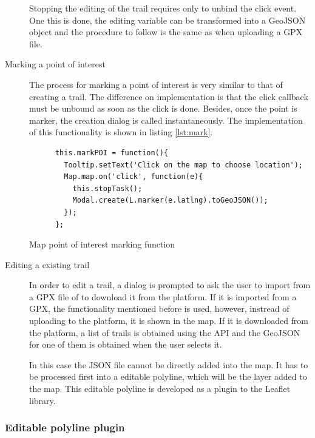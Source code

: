 \begin{description}
Stopping the editing of the trail requires only to unbind the click event. One this is done, the editing variable can be transformed into a GeoJSON object and the procedure to follow is the same as when uploading a GPX file.

\item[Marking a point of interest] The process for marking a point of interest is very similar to that of creating a trail. The difference on implementation is that the click callback must be unbound as soon as the click is done. Besides, once the point is marker, the creation dialog is called instantaneously. The implementation of this functionality is shown in listing \ref{lst:mark}.

\begin{listing}[ht]\centering
  \begin{minipage}{.85\textwidth}
    \begin{verbatim}
      this.markPOI = function(){
        Tooltip.setText('Click on the map to choose location');
        Map.map.on('click', function(e){
          this.stopTask();
          Modal.create(L.marker(e.latlng).toGeoJSON());
        });
      };
    \end{verbatim}
  \end{minipage}
  \caption{Map point of interest marking function}\label{lst:mark}
\end{listing}

\item[Editing a existing trail] In order to edit a trail, a dialog is prompted to ask the user to import from a GPX file of to download it from the platform. If it is imported from a GPX, the functionality mentioned before is used, however, instread of uploading to the platform, it is shown in the map. If it is downloaded from the platform, a list of trails is obtained using the API and the GeoJSON for one of them is obtained when the user selects it.

In this case the JSON file cannot be directly added into the map. It has to be processed first into a editable polyline, which will be the layer added to the map. This editable polyline is developed as a plugin to the Leaflet library.
\end{description}

\subsubsection*{Editable polyline plugin}

